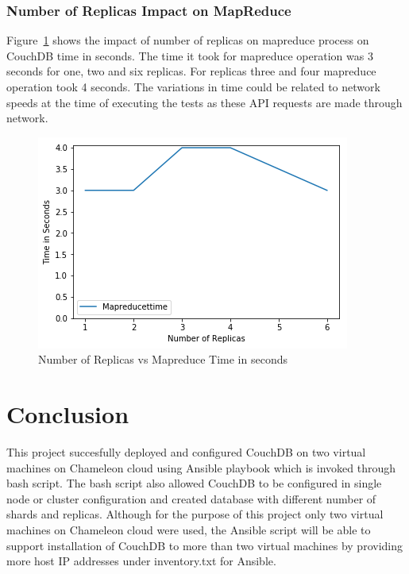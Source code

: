 \subsubsection{Number of Replicas Impact on MapReduce}


Figure~\ref{f:replica-mapreduce} shows the impact of number of replicas on
mapreduce process on CouchDB time in seconds. The time it took for
mapreduce operation was 3 seconds for one, two and six replicas. For
replicas three and four mapreduce operation took 4 seconds. The
variations in time could be related to network speeds at the time of
executing the tests as these API requests are made through network. 

\begin{figure}[!ht]
  \centering\includegraphics[width=\columnwidth]{../images/ReplicasMapReduce.png}
  \caption{Number of Replicas vs Mapreduce Time in seconds }\label{f:replica-mapreduce}
\end{figure}

\section{Conclusion}
This project succesfully deployed and configured CouchDB  on two virtual machines
on Chameleon cloud using Ansible playbook which is invoked through
bash script. The bash script also allowed CouchDB to be configured in
single node or cluster configuration and created database with
different number of shards and replicas. Although for the purpose of
this project only two virtual machines on Chameleon cloud were used,
the Ansible script will be able to support installation of CouchDB to more
than two virtual machines by providing more host IP addresses under
inventory.txt for Ansible.

